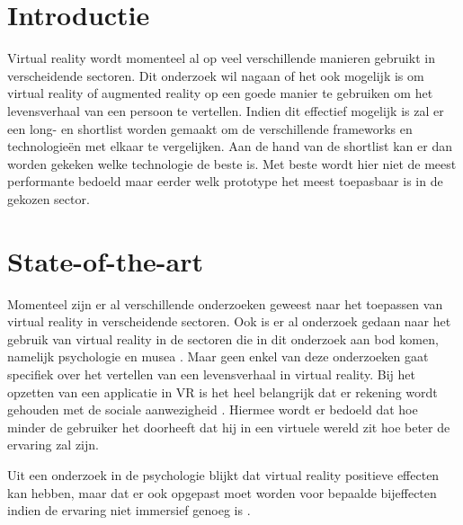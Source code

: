 
\section{Introductie} %
\label{sec:introductie}

Virtual reality wordt momenteel al op veel verschillende manieren gebruikt in verscheidende sectoren. Dit onderzoek wil nagaan of het ook mogelijk is om virtual reality of augmented reality op een goede manier te gebruiken om het levensverhaal van een persoon te vertellen. Indien dit effectief mogelijk is zal er een long- en shortlist worden gemaakt om de verschillende frameworks en technologieën met elkaar te vergelijken. Aan de hand van de shortlist kan er dan worden gekeken welke technologie de beste is. Met beste wordt hier niet de meest performante bedoeld maar eerder welk prototype het meest toepasbaar is in de gekozen sector.


\section{State-of-the-art}
\label{sec:state-of-the-art}

Momenteel zijn er al verschillende onderzoeken geweest naar het toepassen van virtual reality in verscheidende sectoren. Ook is er al onderzoek gedaan naar het gebruik van virtual reality in de sectoren die in dit onderzoek aan bod komen, namelijk psychologie \autocite{Wilson2014} en musea \autocite{Jung2016}. Maar geen enkel van deze onderzoeken gaat specifiek over het vertellen van een levensverhaal in virtual reality.
Bij het opzetten van een applicatie in VR is het heel belangrijk dat er rekening wordt gehouden met de sociale aanwezigheid \autocite{Jung2016}. Hiermee wordt er bedoeld dat hoe minder de gebruiker het doorheeft dat hij in een virtuele wereld zit hoe beter de ervaring zal zijn.   

Uit een onderzoek in de psychologie blijkt dat virtual reality positieve effecten kan hebben, maar dat er ook opgepast moet worden voor bepaalde bijeffecten indien de ervaring niet immersief genoeg is \autocite{Wilson2014}.

